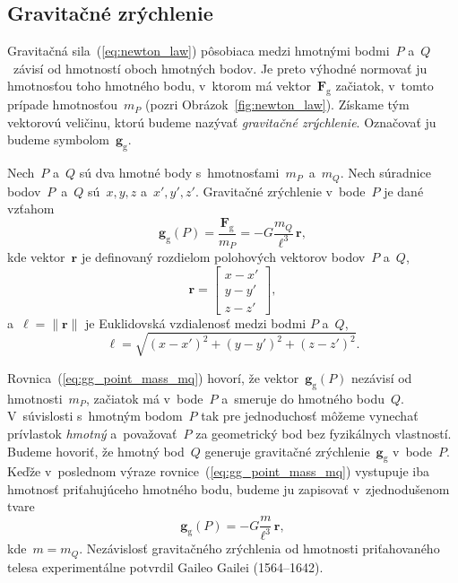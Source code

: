 \documentclass[a4paper, 12pt]{book}
\newcommand{\gidx}{\mathrm g}
\let\vec\mathbf
\begin{document}
\subsection{Gravitačné zrýchlenie}
\label{sec:gg}

Gravitačná sila~(\ref{eq:newton_law}) pôsobiaca medzi hmotnými bodmi~$P$ 
a~$Q$~závisí od hmotností oboch hmotných bodov.  Je preto výhodné normovať ju 
hmotnosťou toho hmotného bodu, v~ktorom má vektor~$\vec F_\gidx$ začiatok, 
v~tomto prípade hmotnosťou~$m_P$ (pozri Obrázok~\ref{fig:newton_law}).  Získame 
tým vektorovú veličinu, ktorú budeme nazývať \emph{gravitačné zrýchlenie}.  
Označovať ju budeme symbolom~$\vec g_\gidx$.

Nech~$P$ a~$Q$ sú dva hmotné body s~hmotnosťami~$m_P$~a~$m_Q$.  Nech súradnice 
bodov~$P$~a~$Q$ sú~$x, y, z$ a~$x', y', z'$.  Gravitačné zrýchlenie v~bode~$P$ 
je dané vzťahom
%
\begin{equation}
\label{eq:gg_point_mass_mq}
\vec g_\gidx(P) = \frac{\vec F_\gidx}{m_P} = -G \frac{m_Q}{\ell^3} \, 
\vec{r}{,}
\end{equation}
%
kde vektor~$\vec r$ je definovaný rozdielom polohových vektorov bodov~$P$ 
a~$Q$,
%
\begin{equation}
\label{eq:r}
\vec r =
%
\begin{bmatrix}
x - x'\\
y - y'\\
z - z'
\end{bmatrix}
{,}
\end{equation}
%
a~$\ell = \| \vec r \|$ je Euklidovská vzdialenosť medzi bodmi $P$ a~$Q$,
%
\begin{equation}
\label{eq:l}
\ell = \sqrt{(x - x')^2 + (y - y')^2 + (z - z')^2}{.}
\end{equation}

Rovnica~(\ref{eq:gg_point_mass_mq}) hovorí, že vektor~$\vec g_\gidx(P)$ 
nezávisí od hmotnosti~$m_P$, začiatok má v~bode~$P$ a~smeruje do hmotného 
bodu~$Q$.  V~súvislosti s~hmotným bodom~$P$ tak pre jednoduchosť môžeme 
vynechať prívlastok \emph{hmotný} a~považovať~$P$ za geometrický bod bez 
fyzikálnych vlastností.  Budeme hovoriť, že hmotný bod~$Q$ generuje gravitačné 
zrýchlenie~$\vec g_\gidx$ v~bode~$P$.  Keďže v~poslednom výraze 
rovnice~(\ref{eq:gg_point_mass_mq}) vystupuje iba hmotnosť priťahujúceho 
hmotného bodu, budeme ju zapisovať v~zjednodušenom tvare
%
\begin{equation}
\label{eq:gg_point_mass}
\vec g_\gidx(P) = -G \frac{m}{\ell^3} \, \vec{r}{,}
\end{equation}
%
kde~$m = m_Q$.  Nezávislosť gravitačného zrýchlenia od 
hmotnosti priťahovaného telesa experimentálne potvrdil Gaileo Gailei 
(1564--1642).
\end{document}
